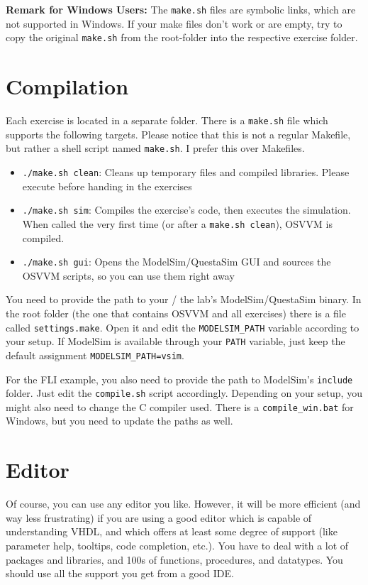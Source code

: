 \documentclass[12pt,epsf,makeidx,oneside]{book}
\begin{document}
  {\bf Remark for Windows Users: } The {\tt make.sh} files are symbolic links, which are not supported in Windows. If your make files don't work or are empty,
  try to copy the original {\tt make.sh} from the root-folder into the respective exercise folder.

\section{Compilation}
  Each exercise is located in a separate folder. There is a {\tt make.sh} file which supports the following targets. Please notice that this
  is not a regular Makefile, but rather a shell script named {\tt make.sh}. I prefer this over Makefiles.
  \begin{itemize}[noitemsep]
    \item {\tt ./make.sh clean}: Cleans up temporary files and compiled libraries. Please execute before handing in the exercises
    \item {\tt ./make.sh sim}: Compiles the exercise's code, then executes the simulation. When called the very first time (or after a {\tt make.sh clean}), OSVVM is compiled.
    \item {\tt ./make.sh gui}: Opens the ModelSim/QuestaSim GUI and sources the OSVVM scripts, so you can use them right away
  \end{itemize}
  You need to provide the path to your / the lab's ModelSim/QuestaSim binary. In the root folder (the one that contains OSVVM and all 
  exercises) there is a file called {\tt settings.make}. Open it and edit the {\tt MODELSIM\_PATH} variable according to your setup.
  If ModelSim is available through your {\tt PATH} variable, just keep the default assignment {\tt MODELSIM\_PATH=vsim}.

  For the FLI example, you also need to provide the path to ModelSim's {\tt include} folder. Just edit the {\tt compile.sh} script accordingly. Depending on your setup,
  you might also need to change the C compiler used. There is a {\tt compile\_win.bat} for Windows, but you need to update the paths as well.

\section{Editor}
  Of course, you can use any editor you like. However, it will be more efficient (and way less frustrating) if you are using a good editor which is capable of
  understanding VHDL, and which offers at least some degree of support (like parameter help, tooltips, code completion, etc.). You have to deal with a lot
  of packages and libraries, and 100s of functions, procedures, and datatypes. You should use all the support you get from a good IDE.
\end{document}
